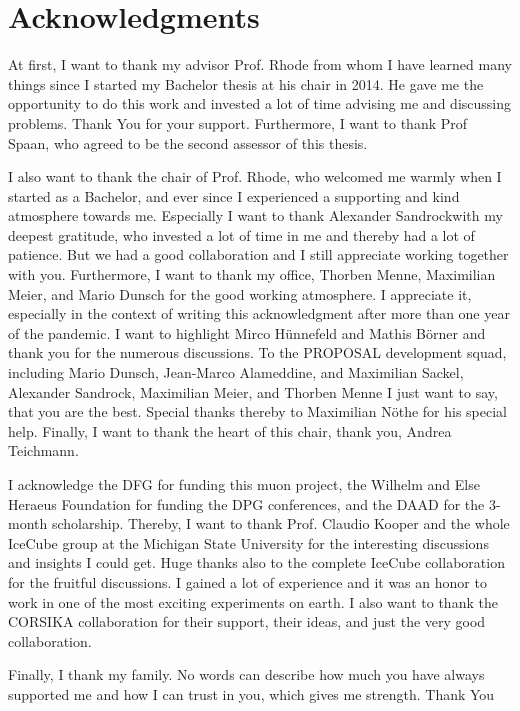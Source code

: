 \chapter*{Acknowledgments}

At first, I want to thank my advisor Prof. Rhode from whom I have learned many things since I started my Bachelor thesis at his chair in 2014.
He gave me the opportunity to do this work and invested a lot of time advising me and discussing problems.
Thank You for your support.
Furthermore, I want to thank Prof Spaan, who agreed to be the second assessor of this thesis.

I also want to thank the chair of Prof. Rhode, who welcomed me warmly when I started as a Bachelor, and ever since I experienced a supporting and kind atmosphere towards me.
Especially I want to thank Alexander Sandrockwith my deepest gratitude, who invested a lot of time in me and thereby had a lot of patience. But we had a good collaboration and I still appreciate working together with you.
Furthermore, I want to thank my office, Thorben Menne, Maximilian Meier, and Mario Dunsch for the good working atmosphere. I appreciate it, especially in the context of writing this acknowledgment after more than one year of the pandemic.
I want to highlight Mirco Hünnefeld and Mathis Börner and thank you for the numerous discussions.
To the PROPOSAL development squad, including Mario Dunsch, Jean-Marco Alameddine, and Maximilian Sackel, Alexander Sandrock, Maximilian Meier, and Thorben Menne I just want to say, that you are the best.
Special thanks thereby to Maximilian Nöthe for his special help.
Finally, I want to thank the heart of this chair, thank you, Andrea Teichmann.

I acknowledge the DFG for funding this muon project, the Wilhelm and Else Heraeus Foundation for funding the DPG conferences, and the DAAD for the 3-month scholarship.
Thereby, I want to thank Prof. Claudio Kooper and the whole IceCube group at the Michigan State University for the interesting discussions and insights I could get.
Huge thanks also to the complete IceCube collaboration for the fruitful discussions. I gained a lot of experience and it was an honor to work in one of the most exciting experiments on earth.
I also want to thank the CORSIKA collaboration for their support, their ideas, and just the very good collaboration.

Finally, I thank my family.
No words can describe how much you have always supported me and how I can trust in you, which gives me strength.
Thank You